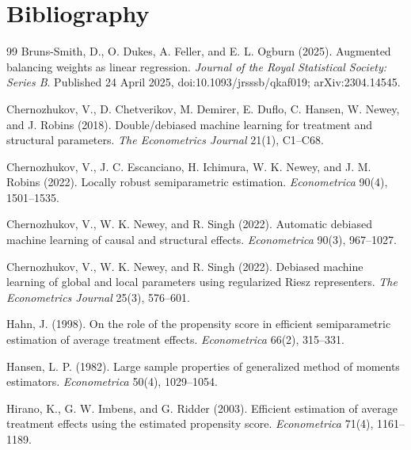 \documentclass[11pt]{article}
\theoremstyle{definition}
\theoremstyle{plain}
\theoremstyle{remark}
\begin{document}
\section*{Bibliography}
\begin{thebibliography}{99}
Bruns-Smith, D., O. Dukes, A. Feller, and E. L. Ogburn (2025).
\newblock Augmented balancing weights as linear regression.
\newblock \emph{Journal of the Royal Statistical Society: Series B}.
\newblock Published 24 April 2025, doi:10.1093/jrsssb/qkaf019;
arXiv:2304.14545.

Chernozhukov, V., D. Chetverikov, M. Demirer, E. Duflo, C. Hansen,
W. Newey, and J. Robins (2018).
\newblock Double/debiased machine learning for treatment and structural
parameters.
\newblock \emph{The Econometrics Journal} 21(1), C1--C68.

Chernozhukov, V., J. C. Escanciano, H. Ichimura, W. K. Newey, and J. M. Robins
(2022).
\newblock Locally robust semiparametric estimation.
\newblock \emph{Econometrica} 90(4), 1501--1535.

Chernozhukov, V., W. K. Newey, and R. Singh (2022).
\newblock Automatic debiased machine learning of causal and structural effects.
\newblock \emph{Econometrica} 90(3), 967--1027.

Chernozhukov, V., W. K. Newey, and R. Singh (2022).
\newblock Debiased machine learning of global and local parameters using
regularized Riesz representers.
\newblock \emph{The Econometrics Journal} 25(3), 576--601.

Hahn, J. (1998).
\newblock On the role of the propensity score in efficient semiparametric
estimation of average treatment effects.
\newblock \emph{Econometrica} 66(2), 315--331.

Hansen, L. P. (1982).
\newblock Large sample properties of generalized method of moments estimators.
\newblock \emph{Econometrica} 50(4), 1029--1054.

Hirano, K., G. W. Imbens, and G. Ridder (2003).
\newblock Efficient estimation of average treatment effects using the estimated
propensity score.
\newblock \emph{Econometrica} 71(4), 1161--1189.


\end{thebibliography}
\end{document}
